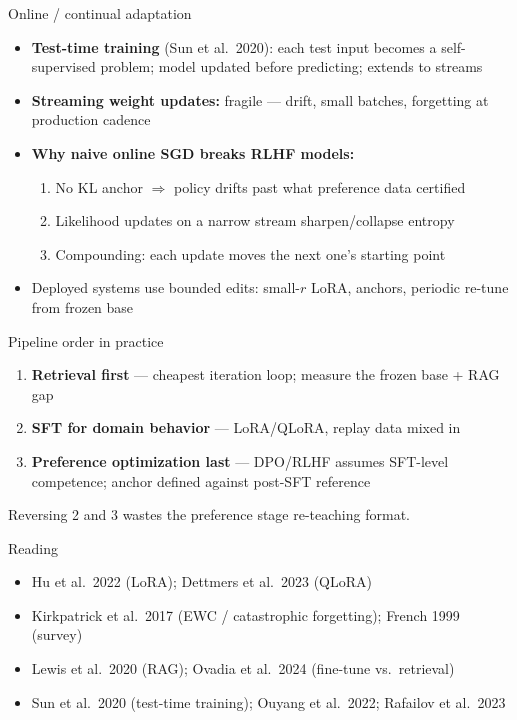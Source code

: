 \documentclass[aspectratio=169,11pt]{beamer}
\begin{document}
\begin{frame}{Online / continual adaptation}
\begin{itemize}
\item \textbf{Test-time training} (Sun et al.\ 2020): each test input becomes a self-supervised problem; model updated before predicting; extends to streams
\item \textbf{Streaming weight updates:} fragile --- drift, small batches, forgetting at production cadence
\item \textbf{Why naive online SGD breaks RLHF models:}
  \begin{enumerate}
  \item No KL anchor $\Rightarrow$ policy drifts past what preference data certified
  \item Likelihood updates on a narrow stream sharpen/collapse entropy
  \item Compounding: each update moves the next one's starting point
  \end{enumerate}
\item Deployed systems use bounded edits: small-$r$ LoRA, anchors, periodic re-tune from frozen base
\end{itemize}
\end{frame}

\begin{frame}{Pipeline order in practice}
\begin{enumerate}
\item \textbf{Retrieval first} --- cheapest iteration loop; measure the frozen base + RAG gap
\item \textbf{SFT for domain behavior} --- LoRA/QLoRA, replay data mixed in
\item \textbf{Preference optimization last} --- DPO/RLHF assumes SFT-level competence; anchor defined against post-SFT reference
\end{enumerate}
\vspace{1em}
Reversing 2 and 3 wastes the preference stage re-teaching format.
\end{frame}

\begin{frame}{Reading}
\begin{itemize}
\item Hu et al.\ 2022 (LoRA); Dettmers et al.\ 2023 (QLoRA)
\item Kirkpatrick et al.\ 2017 (EWC / catastrophic forgetting); French 1999 (survey)
\item Lewis et al.\ 2020 (RAG); Ovadia et al.\ 2024 (fine-tune vs.\ retrieval)
\item Sun et al.\ 2020 (test-time training); Ouyang et al.\ 2022; Rafailov et al.\ 2023
\end{itemize}
\end{frame}
\end{document}
